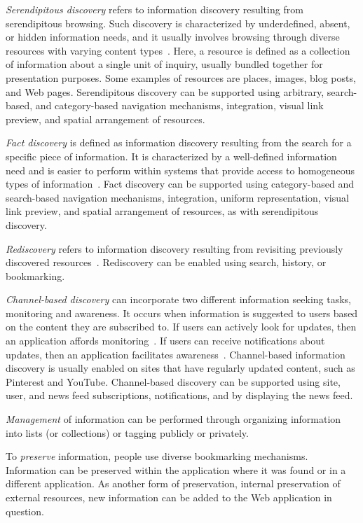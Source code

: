 {\textit{Serendipitous discovery} refers to information discovery resulting from serendipitous browsing. Such discovery is characterized by underdefined, absent, or hidden information needs, and it usually involves browsing through diverse resources with varying content types~\cite{kellar2006goal, kellar2007field}. Here, a resource is defined as a collection of information about a single unit of inquiry, usually bundled together for presentation purposes. Some examples of resources are places, images, blog posts, and Web pages. Serendipitous discovery can be supported using arbitrary, search-based, and category-based navigation mechanisms, integration, visual link preview, and spatial arrangement of resources.


\textit{Fact discovery} is defined as information discovery resulting from the search for a specific piece of information. It is characterized by a well-defined information need and is easier to perform within systems that provide access to homogeneous types of information~\cite{kellar2006goal, lindley2012s}. Fact discovery can be supported using category-based and search-based navigation mechanisms, integration, uniform representation, visual link preview, and spatial arrangement of resources, as with serendipitous discovery. 

\textit{Rediscovery} refers to information discovery resulting from revisiting previously discovered resources~\cite{tauscher1997people}. Rediscovery can be enabled using search, history, or bookmarking.

\textit{Channel-based discovery} can incorporate two different information seeking tasks, monitoring and awareness. It occurs when information is suggested to users based on the content they are subscribed to. If users can actively look for updates, then an application affords monitoring~\cite{morrison2001taxonomic}. If users can receive notifications about updates, then an application facilitates awareness~\cite{bates1986exploratory,bates2002toward}. Channel-based information discovery is usually enabled on sites that have regularly updated content, such as Pinterest and YouTube. Channel-based discovery can be supported using site, user, and news feed subscriptions, notifications, and by displaying the news feed.   

\textit{Management} of information can be performed through organizing information into lists (or collections) or tagging publicly or privately.  

To \textit{preserve} information, people use diverse bookmarking mechanisms. Information can be preserved within the application where it was found or in a different application. As another form of preservation, internal preservation of external resources, new information can be added to the Web application in question.

}
